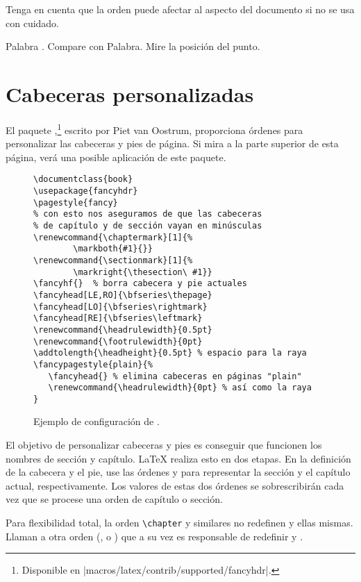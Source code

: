 Tenga en cuenta que la orden  puede afectar al aspecto del documento si no se usa con cuidado.

\begin{example}
Palabra . Compare
con Palabra. Mire
la posición del punto.
\end{example}

\section{Cabeceras personalizadas}
\label{sec:fancy}

El paquete ,\footnote{Disponible en \CTANref|macros/latex/contrib/supported/fancyhdr|.} escrito por Piet van Oostrum, proporciona órdenes para personalizar las cabeceras y pies de página.  Si mira a la parte superior de esta página, verá una posible aplicación de este paquete.

\begin{figure}[!htbp]
\begin{lined}{\textwidth}
\begin{verbatim}
\documentclass{book}
\usepackage{fancyhdr}
\pagestyle{fancy}
% con esto nos aseguramos de que las cabeceras
% de capítulo y de sección vayan en minúsculas
\renewcommand{\chaptermark}[1]{%
        \markboth{#1}{}}
\renewcommand{\sectionmark}[1]{%
        \markright{\thesection\ #1}}
\fancyhf{}  % borra cabecera y pie actuales
\fancyhead[LE,RO]{\bfseries\thepage}
\fancyhead[LO]{\bfseries\rightmark}
\fancyhead[RE]{\bfseries\leftmark}
\renewcommand{\headrulewidth}{0.5pt}
\renewcommand{\footrulewidth}{0pt}
\addtolength{\headheight}{0.5pt} % espacio para la raya
\fancypagestyle{plain}{%
   \fancyhead{} % elimina cabeceras en páginas "plain"
   \renewcommand{\headrulewidth}{0pt} % así como la raya
}
\end{verbatim}
\end{lined}
\caption{Ejemplo de configuración de .} \label{fancyhdr}
\end{figure}

El objetivo de personalizar cabeceras y pies es conseguir que funcionen los nombres de sección y capítulo.  \LaTeX{} realiza esto en dos etapas.  En la definición de la cabecera y el pie, use las órdenes   y  para representar la sección y el capítulo actual, respectivamente. Los valores de estas dos órdenes se sobrescribirán cada vez que se procese una orden de capítulo o sección.

Para flexibilidad total, la orden \verb|\chapter| y similares no redefinen  y  ellas mismas.  Llaman a otra orden (,  o ) que a su vez es responsable de redefinir  y .

